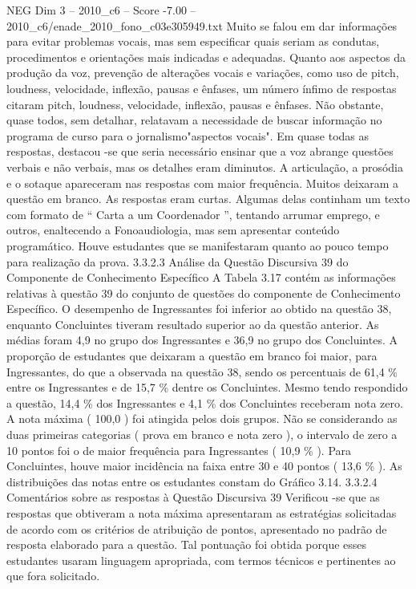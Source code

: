 \begin{textsample}{NEG Dim 3 – 2010\_c6 – Score -7.00 – 2010\_c6/enade\_2010\_fono\_c03e305949.txt}
Muito se falou em dar informações para evitar problemas vocais, mas sem especificar quais seriam as condutas, procedimentos e orientações mais indicadas e adequadas.
Quanto aos aspectos da produção da voz, prevenção de alterações vocais e variações, como uso de pitch, loudness, velocidade, inflexão, pausas e ênfases, um número ínfimo de respostas citaram pitch, loudness, velocidade, inflexão, pausas e ênfases.
Não obstante, quase todos, sem detalhar, relatavam a necessidade de buscar informação no programa de curso para o jornalismo"aspectos vocais".
Em quase todas as respostas, destacou -se que seria necessário ensinar que a voz abrange questões verbais e não verbais, mas os detalhes eram diminutos.
A articulação, a prosódia e o sotaque apareceram nas respostas com maior frequência.
Muitos deixaram a questão em branco.
As respostas eram curtas.
Algumas delas continham um texto com formato de “ Carta a um Coordenador ”, tentando arrumar emprego, e outros, enaltecendo a Fonoaudiologia, mas sem apresentar conteúdo programático.
Houve estudantes que se manifestaram quanto ao pouco tempo para realização da prova. 3.3.2.3 Análise da Questão Discursiva 39 do Componente de Conhecimento Específico A Tabela 3.17 contém as informações relativas à questão 39 do conjunto de questões do componente de Conhecimento Específico.
O desempenho de Ingressantes foi inferior ao obtido na questão 38, enquanto Concluintes tiveram resultado superior ao da questão anterior.
As médias foram 4,9 no grupo dos Ingressantes e 36,9 no grupo dos Concluintes.
A proporção de estudantes que deixaram a questão em branco foi maior, para Ingressantes, do que a observada na questão 38, sendo os percentuais de 61,4 \% entre os Ingressantes e de 15,7 \% dentre os Concluintes.
Mesmo tendo respondido a questão, 14,4 \% dos Ingressantes e 4,1 \% dos Concluintes receberam nota zero.
A nota máxima ( 100,0 ) foi atingida pelos dois grupos.
Não se considerando as duas primeiras categorias ( prova em branco e nota zero ), o intervalo de zero a 10 pontos foi o de maior frequência para Ingressantes ( 10,9 \% ).
Para Concluintes, houve maior incidência na faixa entre 30 e 40 pontos ( 13,6 \% ).
As distribuições das notas entre os estudantes constam do Gráfico 3.14. 3.3.2.4 Comentários sobre as respostas à Questão Discursiva 39 Verificou -se que as respostas que obtiveram a nota máxima apresentaram as estratégias solicitadas de acordo com os critérios de atribuição de pontos, apresentado no padrão de resposta elaborado para a questão.
Tal pontuação foi obtida porque esses estudantes usaram linguagem apropriada, com termos técnicos e pertinentes ao que fora solicitado.

\end{textsample}
